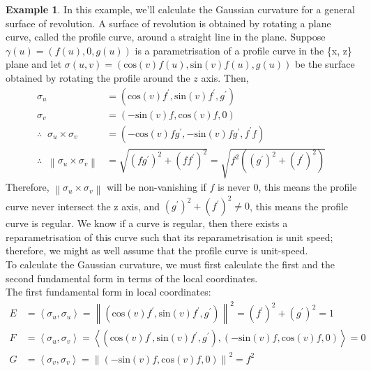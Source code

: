 \documentclass{article}
\theoremstyle{plain}
\theoremstyle{definition}
\newtheorem{example}{Example}
\theoremstyle{remark}
\begin{document}
\begin{example} \label{eg: Gaussian curvature of surface of revolution}
    In this example, we'll calculate the Gaussian curvature for a general surface of revolution. A surface of revolution is obtained by rotating a plane curve, called the profile curve, around a straight line in the plane. Suppose \( \gamma(u) = (f(u),0,g(u))\) is a parametrisation of a profile curve in the \{x, z\} plane and let \( \sigma(u,v) = (\text{cos}(v)f(u), \text{sin}(v)f(u), g(u) )\) be the surface obtained by rotating the profile around the \(z\) axis. Then, 
    \begin{align*}
        \sigma_u & = (\text{cos}(v)f^{\prime}, \text{sin}(v)f^{\prime}, g^{\prime} ) \\
        \sigma_v & = (-\text{sin}(v)f, \text{cos}(v)f, 0) \\
        \therefore \; \; \sigma_u \times \sigma_v & = (-\text{cos}(v)fg^{\prime} , -\text{sin}(v)fg^{\prime}, f^{\prime} f) \\
        \therefore \; \; \left\lVert\sigma_u \times \sigma_v \right\rVert & = \sqrt{(fg^{\prime})^2 + (ff^{\prime})^2} = \sqrt{f^2((g^{\prime})^2 + (f^{\prime})^2)}
    \end{align*} 
    Therefore, \( \left\lVert\sigma_u \times \sigma_v \right\rVert \) will be non-vanishing if \( f \) is never \(0\), this means the profile curve never intersect the z axis, and \(  (g^{\prime})^2 + (f^{\prime})^2 \neq 0 \), this means the profile curve is regular. We know if a curve is regular, then there exists a reparametrisation of this curve such that its reparametrisation is unit speed; therefore, we might as well assume that the profile curve is unit-speed. \\
    To calculate the Gaussian curvature, we must first calculate the first and the second fundamental form in terms of the local coordinates. \\
    The first fundamental form in local coordinates: 
    \begin{align*}
        E & = \left\langle \sigma_u , \sigma_u\right\rangle  = \left\lVert (\text{cos}(v)f^{\prime}, \text{sin}(v)f^{\prime}, g^{\prime} ) \right\rVert^2 = (f^{\prime})^2 + (g^{\prime})^2  = 1 \\
        F & = \left\langle \sigma_u, \sigma_v \right\rangle = \left\langle (\text{cos}(v)f^{\prime}, \text{sin}(v)f^{\prime}, g^{\prime} ), (-\text{sin}(v)f, \text{cos}(v)f, 0 ) \right\rangle = 0 \\
        G & = \left\langle \sigma_v, \sigma_v \right\rangle  = \left\lVert (-\text{sin}(v)f, \text{cos}(v)f, 0) \right\rVert ^2 = f^2

\end{align*}
\end{example}
\end{document}
